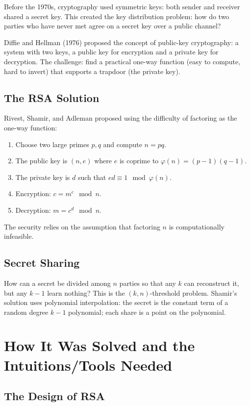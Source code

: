 Before the 1970s, cryptography used symmetric keys: both sender and receiver shared a secret key. This created the key distribution problem: how do two parties who have never met agree on a secret key over a public channel?

Diffie and Hellman (1976) proposed the concept of public-key cryptography: a system with two keys, a public key for encryption and a private key for decryption. The challenge: find a practical one-way function (easy to compute, hard to invert) that supports a trapdoor (the private key).

\subsection{The RSA Solution}

Rivest, Shamir, and Adleman proposed using the difficulty of factoring as the one-way function:
\begin{enumerate}
    \item Choose two large primes $p, q$ and compute $n = pq$.
    \item The public key is $(n, e)$ where $e$ is coprime to $\varphi(n) = (p-1)(q-1)$.
    \item The private key is $d$ such that $ed \equiv 1 \mod \varphi(n)$.
    \item Encryption: $c = m^e \mod n$.
    \item Decryption: $m = c^d \mod n$.
\end{enumerate}

The security relies on the assumption that factoring $n$ is computationally infeasible.

\subsection{Secret Sharing}

How can a secret be divided among $n$ parties so that any $k$ can reconstruct it, but any $k-1$ learn nothing? This is the $(k,n)$-threshold problem. Shamir's solution uses polynomial interpolation: the secret is the constant term of a random degree $k-1$ polynomial; each share is a point on the polynomial.

\section{How It Was Solved and the Intuitions/Tools Needed}

\subsection{The Design of RSA}

